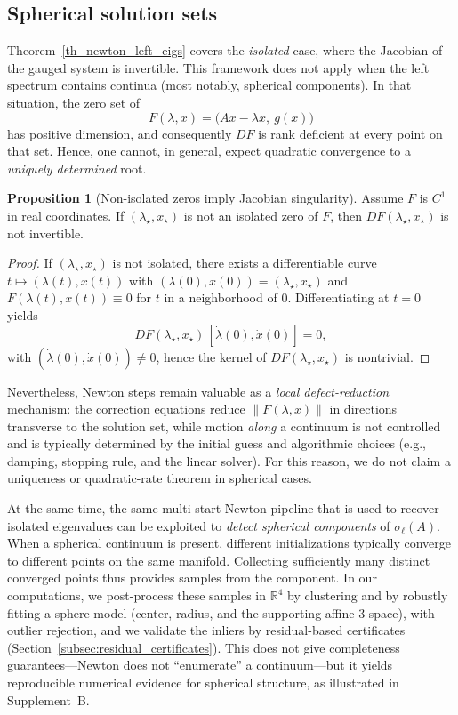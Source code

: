 \documentclass[preprint,12pt]{elsarticle}  %
\theoremstyle{definition}
\theoremstyle{definition}
\theoremstyle{definition}
\theoremstyle{definition}
\theoremstyle{definition}
\newtheorem{Pro}{Proposition}
\theoremstyle{remark}
\theoremstyle{remark}
\theoremstyle{remark}
\newcommand{\RR}{\mathbb{R}}
\begin{document}
\subsection{Spherical solution sets}
\label{subsec_newton_spherical}

Theorem~\ref{th_newton_left_eigs} covers the \emph{isolated} case, where the Jacobian of the gauged system is invertible.
This framework does not apply when the left spectrum contains continua (most notably, spherical components). In that situation, the zero set of
\[
F(\lambda,x)=\bigl(Ax-\lambda x,\ g(x)\bigr)
\]
has positive dimension, and consequently $DF$ is rank deficient at every point on that set. Hence, one cannot, in general, expect quadratic convergence to a \emph{uniquely determined} root.

\begin{Pro}[Non-isolated zeros imply Jacobian singularity]
\label{pro_nonisolated_implies_singular}
Assume $F$ is $C^1$ in real coordinates. If $(\lambda_\star,x_\star)$ is not an isolated zero of $F$, then
$DF(\lambda_\star,x_\star)$ is not invertible.
\end{Pro}
\begin{proof}
If $(\lambda_\star,x_\star)$ is not isolated, there exists a differentiable curve
$t\mapsto(\lambda(t),x(t))$ with $(\lambda(0),x(0))=(\lambda_\star,x_\star)$ and $F(\lambda(t),x(t))\equiv 0$
for $t$ in a neighborhood of $0$. Differentiating at $t=0$ yields
\[
DF(\lambda_\star,x_\star)\,[\dot\lambda(0),\dot x(0)]=0,
\]
with $(\dot\lambda(0),\dot x(0))\neq 0$, hence the kernel of $DF(\lambda_\star,x_\star)$ is nontrivial.
\end{proof}

Nevertheless, Newton steps remain valuable as a \emph{local defect-reduction} mechanism: the correction equations reduce $\|F(\lambda,x)\|$ in directions transverse to the solution set, while motion \emph{along} a continuum is not
controlled and is typically determined by the initial guess and algorithmic choices (e.g., damping, stopping rule, and the linear solver). For this reason, we do not claim a uniqueness or quadratic-rate theorem in spherical cases.

At the same time, the same multi-start Newton pipeline that is used to recover isolated eigenvalues can be exploited to \emph{detect spherical components} of $\sigma_\ell(A)$. When a spherical continuum is present, different initializations typically converge to different points on the same manifold. Collecting sufficiently many distinct converged points thus provides samples from the component. In our computations, we post-process these samples in $\RR^4$ by clustering and by robustly fitting a sphere model (center, radius, and the supporting affine $3$-space), with outlier rejection, and we
validate the inliers by residual-based certificates (Section~\ref{subsec:residual_certificates}). This does not give
completeness guarantees---Newton does not ``enumerate'' a continuum---but it yields reproducible numerical evidence for spherical structure, as illustrated in Supplement~B.
\end{document}
